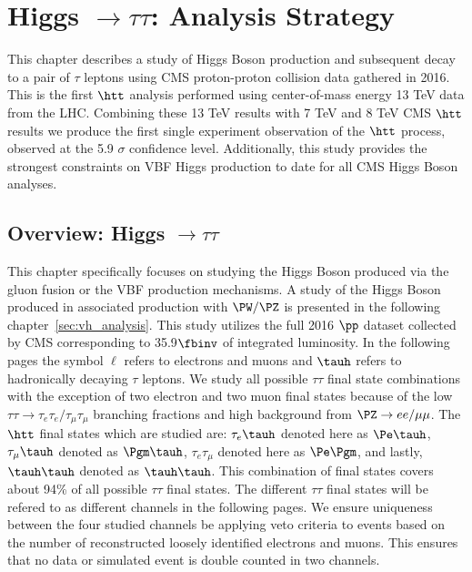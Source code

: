 \chapter{Higgs $\to \tau\tau$: Analysis Strategy}
\label{sec:htt_analysis}

This chapter describes a study of Higgs Boson production and subsequent
decay to a pair of $\tau$ leptons using CMS proton-proton collision data gathered in 2016. This is the first
$\htt$ analysis performed using center-of-mass energy 13 TeV data from the LHC. Combining
these 13 TeV results with 7 TeV and 8 TeV CMS $\htt$ results we produce
the first single experiment observation of the $\htt$ process, observed at the 5.9 $\sigma$
confidence level. Additionally, this study provides the strongest constraints on VBF Higgs 
production to date for all CMS Higgs Boson analyses.

\section{Overview: Higgs $\to \tau\tau$}

This chapter specifically focuses on studying the Higgs Boson produced via the gluon fusion
or the VBF production mechanisms. A study of the Higgs Boson produced in associated production with
$\PW/\PZ$ is presented in the following chapter~\ref{sec:vh_analysis}. This study utilizes the
full 2016 $\pp$ dataset collected by CMS corresponding to 35.9$\fbinv$ of integrated luminosity.
In the following pages the symbol $\ell$ refers to electrons and muons and $\tauh$ refers to hadronically
decaying $\tau$ leptons. We study all possible $\tau\tau$ final state combinations with the
exception of two electron and two muon final states because of the low 
$\tau\tau \to \tau_{e}\tau_{e}/\tau_{\mu}\tau_{\mu}$
branching fractions and high background from $\PZ \to ee/\mu\mu$. The $\htt$ final states which are
studied are: $\tau_{e}\tauh$ denoted here as $\Pe\tauh$, $\tau_{\mu}\tauh$ denoted as $\Pgm\tauh$,
$\tau_{e}\tau_{\mu}$ denoted here as $\Pe\Pgm$, and lastly, $\tauh\tauh$ denoted as $\tauh\tauh$.
This combination of final states covers about 94\% of all possible $\tau\tau$ final states.
The different $\tau\tau$ final states will be refered to as different channels in the following pages.
We ensure uniqueness between the four studied channels be applying veto criteria to events based
on the number of reconstructed loosely identified electrons and muons. This ensures that 
no data or simulated event is double counted in two channels.

